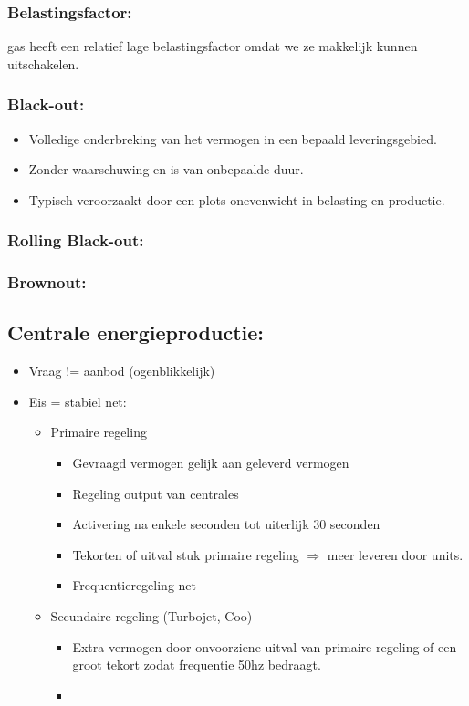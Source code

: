 \documentclass[12pt]{article}
\begin{document}
\subsubsection{Belastingsfactor:}
gas heeft een relatief lage belastingsfactor omdat we ze makkelijk kunnen uitschakelen.
\subsubsection{Black-out:}
\begin{itemize}
    \item Volledige onderbreking van het vermogen in een bepaald leveringsgebied.
    \item Zonder waarschuwing en is van onbepaalde duur.
    \item Typisch veroorzaakt door een plots onevenwicht in belasting en productie.
\end{itemize}
\subsubsection{Rolling Black-out:}
\subsubsection{Brownout:}
\subsection{Centrale energieproductie:}
\begin{itemize}
    \item Vraag != aanbod (ogenblikkelijk)
    \item Eis = stabiel net:\begin{itemize}
        \item Primaire regeling\begin{itemize}
            \item Gevraagd vermogen gelijk aan geleverd vermogen
            \item Regeling output van centrales
            \item Activering na enkele seconden tot uiterlijk 30 seconden
            \item Tekorten of uitval stuk primaire regeling $\Rightarrow$ meer leveren door units.
            \item Frequentieregeling net
        \end{itemize}
        \item Secundaire regeling (Turbojet, Coo)\begin{itemize}
            \item Extra vermogen door onvoorziene uitval van primaire regeling of een groot tekort zodat frequentie 50hz bedraagt.
            \item 
        \end{itemize}
    \end{itemize}
\end{itemize}
\end{document}
